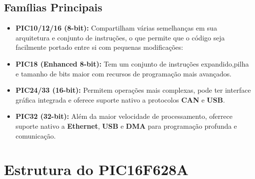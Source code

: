 \documentclass[12pt,a4paper]{book}
\begin{document}
\subsection{Famílias Principais}
\begin{itemize}
    \item \textbf{PIC10/12/16 (8-bit):} Compartilham várias semelhanças em sua arquitetura e conjunto de instruções, o que permite que o código seja facilmente portado entre si com pequenas modificações:
\end{itemize}
\begin{itemize}
    \item \textbf{PIC18 (Enhanced 8-bit):} Tem um conjunto de instruções expandido,pilha e tamanho de bits maior com recursos de programação mais avançados.
\end{itemize}
\begin{itemize}
    \item \textbf{PIC24/33 (16-bit):} Permitem operações mais complexas, pode ter interface gráfica integrada e oferece suporte nativo a protocolos \textbf{CAN} e \textbf{USB}.
\end{itemize}
\begin{itemize}
    \item \textbf{PIC32 (32-bit):} Além da maior velocidade de processamento, oferrece suporte nativo a \textbf{Ethernet}, \textbf{USB} e \textbf{DMA} para programação profunda e comunicação.
\end{itemize}

\section{Estrutura do PIC16F628A}
\end{document}
